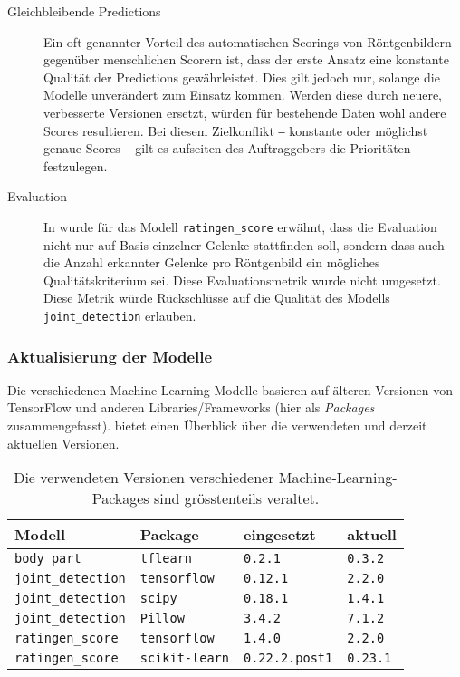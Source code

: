 \begin{description}
    \item [Gleichbleibende Predictions] Ein oft genannter Vorteil des automatischen Scorings von Röntgenbildern gegenüber menschlichen Scorern ist, dass der erste Ansatz eine konstante Qualität der Predictions gewährleistet. Dies gilt jedoch nur, solange die Modelle unverändert zum Einsatz kommen. Werden diese durch neuere, verbesserte Versionen ersetzt, würden für bestehende Daten wohl andere Scores resultieren. Bei diesem Zielkonflikt ‒ konstante oder möglichst genaue Scores ‒ gilt es aufseiten des Auftraggebers die Prioritäten festzulegen.
    \item [Evaluation] In  wurde für das Modell \texttt{ratingen\_score} erwähnt, dass die Evaluation nicht nur auf Basis einzelner Gelenke stattfinden soll, sondern dass auch die Anzahl erkannter Gelenke pro Röntgenbild ein mögliches Qualitätskriterium sei. Diese Evaluationsmetrik wurde nicht umgesetzt. Diese Metrik würde Rückschlüsse auf die Qualität des Modells \texttt{joint\_detection} erlauben.
\end{description}

\subsubsection{Aktualisierung der Modelle}
\label{sec:aktualisierung-auf-aktuelle-versionen}

Die verschiedenen Machine-Learning-Modelle basieren auf älteren Versionen von TensorFlow und anderen Libraries/Frameworks (hier als \textit{Packages} zusammengefasst).  bietet einen Überblick über die verwendeten und derzeit aktuellen Versionen.

\begin{table}[H]
    \center
    \begin{tabular}{l|l|l|l}
        Modell & Package & eingesetzt & aktuell \\ \hline
        \texttt{body\_part} & \texttt{tflearn} & \texttt{0.2.1} & \texttt{0.3.2} \\
        \texttt{joint\_detection} & \texttt{tensorflow} & \texttt{0.12.1} & \texttt{2.2.0} \\
        \texttt{joint\_detection} & \texttt{scipy} & \texttt{0.18.1} & \texttt{1.4.1} \\
        \texttt{joint\_detection} & \texttt{Pillow} & \texttt{3.4.2} & \texttt{7.1.2} \\
        \texttt{ratingen\_score} & \texttt{tensorflow} & \texttt{1.4.0} & \texttt{2.2.0} \\
        \texttt{ratingen\_score} & \texttt{scikit-learn} & \texttt{0.22.2.post1} & \texttt{0.23.1} \\
    \end{tabular}
    \caption{Die verwendeten Versionen verschiedener Machine-Learning-Packages sind grösstenteils veraltet.}
    \label{tbl:versionen}
\end{table}

